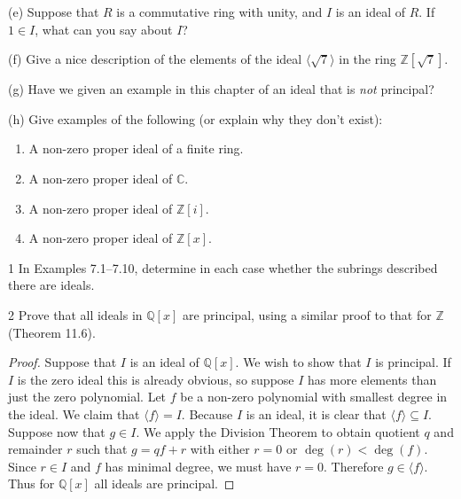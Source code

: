 \begin{problem}[Warmup]{(e)}
    Suppose that $R$ is a commutative ring with unity, and $I$ is an ideal of $R$. If $1 \in I$, what can you say about $I$?
\end{problem}
\unsolved

\begin{problem}[Warmup]{(f)}
    Give a nice description of the elements of the ideal $\langle \sqrt{7} \rangle$ in the ring $\mathbb{Z}[\sqrt{7}]$.
\end{problem}
\unsolved

\begin{problem}[Warmup]{(g)}
    Have we given an example in this chapter of an ideal that is \emph{not} principal?
\end{problem}
\unsolved

\begin{problem}[Warmup]{(h)}
    Give examples of the following (or explain why they don't exist):
    \begin{enumerate}
        \item[(a)] A non-zero proper ideal of a finite ring.
        \item[(b)] A non-zero proper ideal of $\mathbb{C}$.
        \item[(c)] A non-zero proper ideal of $\mathbb{Z}[i]$.
        \item[(d)] A non-zero proper ideal of $\mathbb{Z}[x]$.
    \end{enumerate}
\end{problem}
\unsolved

\begin{problem}{1}
    In Examples 7.1--7.10, determine in each case whether the subrings described there
    are ideals.
\end{problem}
\unsolved

\begin{problem}{2}
    Prove that all ideals in $\mathbb{Q}[x]$ are principal,
        using a similar proof to that for $\mathbb{Z}$ (Theorem 11.6).
\end{problem}
\solved

\begin{proof}
    Suppose that $I$ is an ideal of $\mathbb{Q}[x]$.
    We wish to show that $I$ is principal.
    If $I$ is the zero ideal this is already obvious,
        so suppose $I$ has more elements than just the zero polynomial.
    Let $f$ be a non-zero polynomial with smallest degree in the ideal.
    We claim that $\langle f \rangle = I$.
    Because $I$ is an ideal, it is clear that $\langle f \rangle \subseteq I$.
    Suppose now that $g \in I$. 
    We apply the Division Theorem to obtain quotient $q$ and remainder $r$
        such that $g = q f + r$ with either $r = 0$ or $\deg(r) < \deg(f)$.
    Since $r \in I$ and $f$ has minimal degree, we must have $r = 0$.
    Therefore $g \in \langle f \rangle$.
    Thus for $\mathbb{Q}[x]$ all ideals are principal.
\end{proof}

